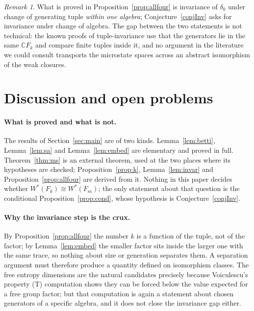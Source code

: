 \documentclass[11pt]{article}
\theoremstyle{plain}
\theoremstyle{definition}
\theoremstyle{remark}
\newtheorem{remark}[theorem]{Remark}
\newcommand{\C}{\mathbb{C}}\newcommand{\N}{\mathbb{N}}
\begin{document}
\begin{remark}
What is proved in Proposition~\ref{prop:allfour} is invariance of $\delta_0$ under change of generating tuple \emph{within one algebra}; Conjecture~\ref{conjInv} asks for invariance under change of algebra. The gap between the two statements is not technical: the known proofs of tuple-invariance use that the generators lie in the same $\C F_k$ and compare finite tuples inside it, and no argument in the literature we could consult transports the microstate spaces across an abstract isomorphism of the weak closures.
\end{remark}

\section{Discussion and open problems}\label{sec:disc}

\paragraph{What is proved and what is not.} The results of Section~\ref{sec:main} are of two kinds. Lemma~\ref{lem:betti}, Lemma~\ref{lem:sa} and Lemma~\ref{lem:embed} are elementary and proved in full. Theorem~\ref{thm:ms} is an external theorem, used at the two places where its hypotheses are checked; Proposition~\ref{prop:k}, Lemma~\ref{lem:invar} and Proposition~\ref{prop:allfour} are derived from it. Nothing in this paper decides whether $W^*(F_k)\cong W^*(F_m)$; the only statement about that question is the conditional Proposition~\ref{prop:cond}, whose hypothesis is Conjecture~\ref{conjInv}.

\paragraph{Why the invariance step is the crux.} By Proposition~\ref{prop:allfour} the number $k$ is a function of the tuple, not of the factor; by Lemma~\ref{lem:embed} the smaller factor sits inside the larger one with the same trace, so nothing about size or generation separates them. A separation argument must therefore produce a quantity defined on isomorphism classes. The free entropy dimensions are the natural candidates precisely because Voiculescu's property (T) computation \cite{Voi99} shows they can be forced below the value expected for a free group factor; but that computation is again a statement about chosen generators of a specific algebra, and it does not close the invariance gap either.
\end{document}
